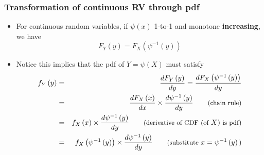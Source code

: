 \documentclass[notes=show,smaller,handout]{beamer}\usepackage[]{graphicx}\usepackage[]{color}
\newenvironment{stepitemize}{\begin{itemize}[<+->]}{\end{itemize} }
\begin{document}
\begin{frame}%

\frametitle{Transformation of continuous RV through pdf }

\begin{stepitemize}
\item For continuous random variables, if $\psi \left( x\right) $ 1-to-1 and
monotone \textbf{increasing}, we have%
\begin{equation*}
F_{Y}\left( y\right) =F_{X}\left( \psi ^{-1}\left( y\right) \right)
\end{equation*}

\item Notice this implies that the pdf of $Y=\psi \left( X\right) $ must
satisfy%
\begin{eqnarray*}
f_{Y}\left( y\right) &=&\frac{dF_{Y}\left( y\right) }{dy}=\frac{dF_{X}\left(
\psi ^{-1}\left( y\right) \right) }{dy} \\
&=&\frac{dF_{X}\left( x\right) }{dx}\times \frac{d\psi ^{-1}\left( y\right)
}{dy}\qquad \text{{\small (chain rule)}} \\
&=&f_{X}\left( x\right) \times \frac{d\psi ^{-1}\left( y\right) }{dy}\qquad
\text{{\small (derivative of CDF (of }}X\text{){\small \ is pdf)}} \\
&=&f_{X}\left( \psi ^{-1}\left( y\right) \right) \times \frac{d\psi
^{-1}\left( y\right) }{dy}\qquad \text{{\small (substitute }}x=\psi
^{-1}\left( y\right) \text{{\small )}}
\end{eqnarray*}
\end{stepitemize}

\end{frame}%
\end{document}
